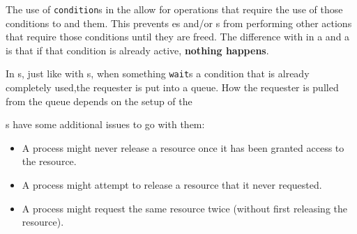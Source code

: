 The use of \texttt{condition}s in the  allow for operations that require the use of those conditions to  and  them.
This prevents es and/or s from performing other actions that require those conditions until they are freed.
The difference with  in a  and a  is that if that condition is already active, \textbf{nothing happens}.

In s, just like with s, when something \texttt{wait}s a condition that is already completely used,the requester is put into a queue.
How the requester is pulled from the queue depends on the setup of the 

s have some additional issues to go with them:
\begin{itemize}[noitemsep]
\item A process might never release a resource once it has been granted access to the resource.
\item A process might attempt to release a resource that it never requested.
\item A process might request the same resource twice (without first releasing the resource).
\end{itemize}


